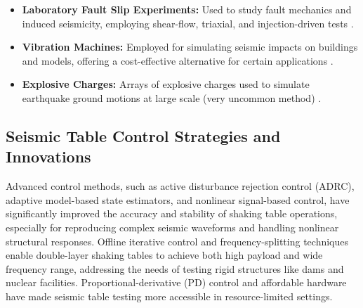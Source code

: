 \documentclass[10pt]{extarticle}
\begin{document}
\begin{itemize}
    \item \textbf{Laboratory Fault Slip Experiments:} Used to study fault mechanics and induced seismicity, employing shear-flow, triaxial, and injection-driven tests \citep{Ji2022Laboratory,Dong2022Investigations}.
    \item \textbf{Vibration Machines:} Employed for simulating seismic impacts on buildings and models, offering a cost-effective alternative for certain applications \citep{Abovyan2024Method}.
    \item \textbf{Explosive Charges:} Arrays of explosive charges used to simulate earthquake ground motions at large scale (very uncommon method) \citep{williams2001}.
\end{itemize}



\subsection{Seismic Table Control Strategies and Innovations}
Advanced control methods, such as active disturbance rejection control (ADRC), adaptive model-based state estimators, and nonlinear signal-based control, have significantly improved the accuracy and stability of shaking table operations, especially for reproducing complex seismic waveforms and handling nonlinear structural responses. %
Offline iterative control and frequency-splitting techniques enable double-layer shaking tables to achieve both high payload and wide frequency range, addressing the needs of testing rigid structures like dams and nuclear facilities. %
Proportional-derivative (PD) control and affordable hardware have made seismic table testing more accessible in resource-limited settings. %
\end{document}
